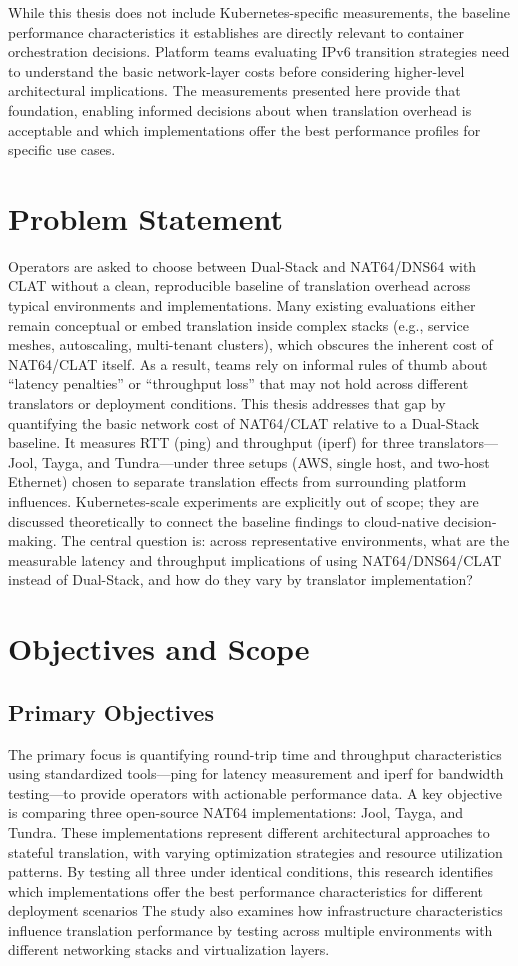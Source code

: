 While this thesis does not include Kubernetes-specific measurements, the baseline performance characteristics it establishes are directly relevant to container orchestration decisions. Platform teams evaluating IPv6 transition strategies need to understand the basic network-layer costs before considering higher-level architectural implications. The measurements presented here provide that foundation, enabling informed decisions about when translation overhead is acceptable and which implementations offer the best performance profiles for specific use cases.


\section{Problem Statement}
Operators are asked to choose between Dual-Stack and NAT64/DNS64 with CLAT without a clean, reproducible baseline of translation overhead across typical environments and implementations. Many existing evaluations either remain conceptual or embed translation inside complex stacks (e.g., service meshes, autoscaling, multi-tenant clusters), which obscures the inherent cost of NAT64/CLAT itself. As a result, teams rely on informal rules of thumb about “latency penalties” or “throughput loss” that may not hold across different translators or deployment conditions.
This thesis addresses that gap by quantifying the basic network cost of NAT64/CLAT relative to a Dual-Stack baseline. It measures RTT (ping) and throughput (iperf) for three translators—Jool, Tayga, and Tundra—under three setups (AWS, single host, and two-host Ethernet) chosen to separate translation effects from surrounding platform influences. Kubernetes-scale experiments are explicitly out of scope; they are discussed theoretically to connect the baseline findings to cloud-native decision-making.
The central question is: across representative environments, what are the measurable latency and throughput implications of using NAT64/DNS64/CLAT instead of Dual-Stack, and how do they vary by translator implementation?


\section{Objectives and Scope}
\subsection{Primary Objectives}
The primary focus is quantifying round-trip time and throughput characteristics using standardized tools—ping for latency measurement and iperf for bandwidth testing—to provide operators with actionable performance data. A key objective is comparing three open-source NAT64 implementations: Jool, Tayga, and Tundra. These implementations represent different architectural approaches to stateful translation, with varying optimization strategies and resource utilization patterns. By testing all three under identical conditions, this research identifies which implementations offer the best performance characteristics for different deployment scenarios The study also examines how infrastructure characteristics influence translation performance by testing across multiple environments with different networking stacks and virtualization layers.


